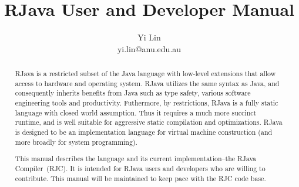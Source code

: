 \documentclass[12pt]{article}
\title{RJava User and Developer Manual}
\author{Yi Lin\\yi.lin@anu.edu.au}
\begin{document}
\newcommand{\rjc}{RJC\xspace}
\newcommand{\rjcfull}{RJava Compiler\xspace}



\newcommand{\javacode}[1]{{\lstinline@#1@}}

\makeatletter{}\makeatother

\maketitle

\begin{abstract}
RJava is a restricted subset of the Java language 
with low-level extensions
that allow access to hardware and operating system. 
RJava utilizes the same syntax as Java, and consequently
inherits benefits from Java such as type safety, 
various software engineering tools and productivity. Futhermore, 
by restrictions, RJava is a fully static language with closed world
assumption. Thus it requires a much more succinct runtime, and
is well suitable for aggressive static compilation and optimizations. 
RJava is designed to be an implementation language for virtual machine
construction (and more broadly for system programming). 

This manual describes the language and its 
current implementation--the \rjcfull~(\rjc). It is intended for RJava users
and developers who are willing to contribute. This manual will be
maintained to keep pace with the \rjc code base. 
\end{abstract}
\clearpage
\end{document}

